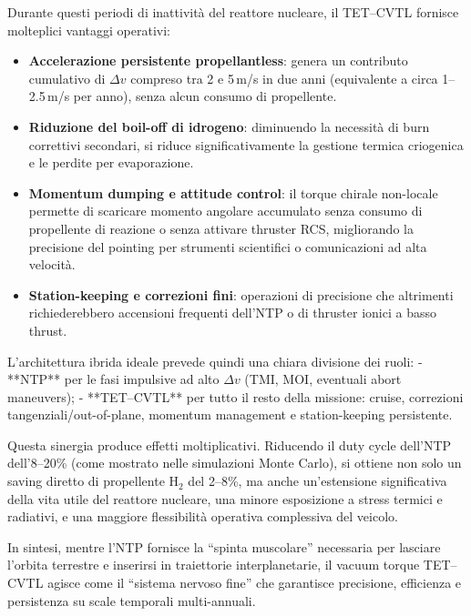 \documentclass[11pt,a4paper]{article}
\theoremstyle{plain}
\theoremstyle{definition}
\begin{document}
\vspace{0.2cm}

Durante questi periodi di inattività del reattore nucleare, il TET--CVTL fornisce molteplici vantaggi operativi:
\begin{itemize}
    \item \textbf{Accelerazione persistente propellantless}: genera un contributo cumulativo di $\Delta v$ compreso tra 2 e 5\,m/s in due anni (equivalente a circa 1--2.5\,m/s per anno), senza alcun consumo di propellente.
    \item \textbf{Riduzione del boil-off di idrogeno}: diminuendo la necessità di burn correttivi secondari, si riduce significativamente la gestione termica criogenica e le perdite per evaporazione.
    \item \textbf{Momentum dumping e attitude control}: il torque chirale non-locale permette di scaricare momento angolare accumulato senza consumo di propellente di reazione o senza attivare thruster RCS, migliorando la precisione del pointing per strumenti scientifici o comunicazioni ad alta velocità.
    \item \textbf{Station-keeping e correzioni fini}: operazioni di precisione che altrimenti richiederebbero accensioni frequenti dell’NTP o di thruster ionici a basso thrust.
\end{itemize}

L’architettura ibrida ideale prevede quindi una chiara divisione dei ruoli:  
- **NTP** per le fasi impulsive ad alto $\Delta v$ (TMI, MOI, eventuali abort maneuvers);  
- **TET--CVTL** per tutto il resto della missione: cruise, correzioni tangenziali/out-of-plane, momentum management e station-keeping persistente.

Questa sinergia produce effetti moltiplicativi. Riducendo il duty cycle dell’NTP dell’8--20\% (come mostrato nelle simulazioni Monte Carlo), si ottiene non solo un saving diretto di propellente H$_2$ del 2--8\%, ma anche un’estensione significativa della vita utile del reattore nucleare, una minore esposizione a stress termici e radiativi, e una maggiore flessibilità operativa complessiva del veicolo.


\vspace{0.2cm}

In sintesi, mentre l’NTP fornisce la “spinta muscolare” necessaria per lasciare l’orbita terrestre e inserirsi in traiettorie interplanetarie, il vacuum torque TET--CVTL agisce come il “sistema nervoso fine” che garantisce precisione, efficienza e persistenza su scale temporali multi-annuali. 
\end{document}

